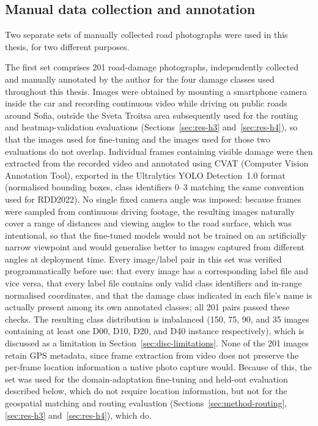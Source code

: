 \documentclass[10pt,a4paper,twocolumn]{article}
\begin{document}
\subsection{Manual data collection and annotation}
\label{sec:method-manual-collection}

Two separate sets of manually collected road photographs were used in
this thesis, for two different purposes.

The first set comprises 201 road-damage photographs, independently
collected and manually annotated by the author for the four damage
classes used throughout this thesis. Images were obtained by mounting a
smartphone camera inside the car and recording continuous video while
driving on public roads around Sofia, outside the Sveta Troitsa area
subsequently used for the routing and heatmap-validation evaluations
(Sections~\ref{sec:res-h3} and~\ref{sec:res-h4}), so that the images used
for fine-tuning and the images used for those two evaluations do not
overlap. Individual frames containing visible damage were then extracted
from the recorded video and annotated using CVAT (Computer Vision
Annotation Tool), exported in the Ultralytics YOLO Detection~1.0 format
(normalised bounding boxes, class identifiers 0--3 matching the same
convention used for RDD2022). No single fixed camera angle was imposed:
because frames were sampled from continuous driving footage, the
resulting images naturally cover a range of distances and viewing angles
to the road surface, which was intentional, so that the fine-tuned
models would not be trained on an artificially narrow viewpoint and
would generalise better to images captured from different angles at
deployment time. Every image/label pair in this set was verified
programmatically before use: that every image has a corresponding label
file and vice versa, that every label file contains only valid class
identifiers and in-range normalised coordinates, and that the damage
class indicated in each file's name is actually present among its own
annotated classes; all 201 pairs passed these checks. The resulting class
distribution is imbalanced (150, 75, 90, and 35 images containing at
least one D00, D10, D20, and D40 instance respectively), which is
discussed as a limitation in Section~\ref{sec:disc-limitations}. None of
the 201 images retain GPS metadata, since frame extraction from video
does not preserve the per-frame location information a native photo
capture would. Because of this, the set was used for the
domain-adaptation fine-tuning and held-out evaluation described below,
which do not require location information, but not for the geospatial
matching and routing evaluation (Sections~\ref{sec:method-routing},
\ref{sec:res-h3} and~\ref{sec:res-h4}), which do.
\end{document}
